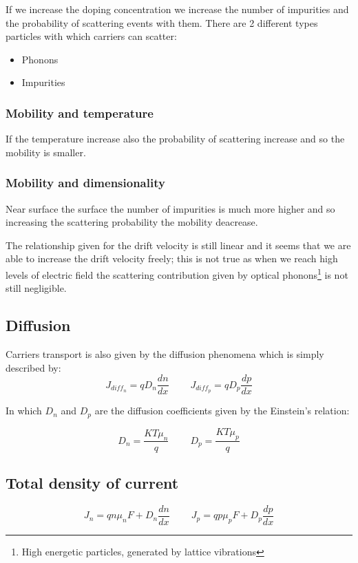 				If we increase the doping concentration we increase the number of impurities and the probability of scattering events with them.
				There are 2 different types particles with which carriers can scatter:
			
				\begin{itemize}
					\item Phonons
					\item Impurities
			
				\end{itemize}
			\subsubsection{Mobility and temperature}
				
				If the temperature increase also the probability of scattering increase and so the mobility is smaller.
			
			\subsubsection{Mobility and dimensionality}
			
			Near surface the surface the number of impurities is much more higher and so increasing the scattering probability the mobility deacrease.

			The relationship given for the drift velocity is still linear and it seems that we are able to increase the drift velocity freely; this is not true as when we reach high levels of 
			electric field the scattering contribution given by optical phonons\footnote{High energetic particles, generated by lattice vibrations} is not still negligible.
		
		\subsection{Diffusion}
			Carriers transport is also given by the diffusion phenomena which is simply described by:
			\begin{equation}
				J_{diff_n}=qD_n\frac{dn}{dx} \ \ \ \ \ \ \ \ \ \   J_{diff_p}=qD_p\frac{dp}{dx}
			\end{equation}

			In which $D_n$ and $D_p$ are the diffusion coefficients given by the Einstein's relation:

			\begin{equation}
				D_n=\frac{KT \mu_n}{q} \ \ \ \ \ \ \ \ \ \ D_p=\frac{KT \mu_p}{q}
			\end{equation}

		\subsection{Total density of current}

			\begin{equation}
				J_n=q n\mu_nF+D_n\frac{dn}{dx} \ \ \ \ \ \ \ \ \ \ J_p=q p\mu_pF+D_p\frac{dp}{dx}
			\end{equation}
